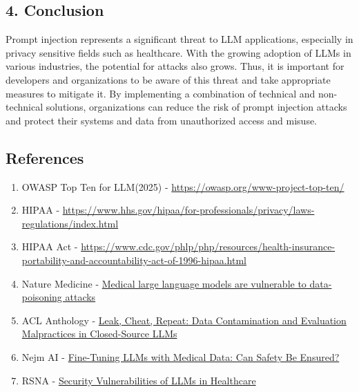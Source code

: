 \documentclass{article}
\theoremstyle{mytheoremstyle}
\theoremstyle{mytheoremstyle}
\theoremstyle{myproblemstyle}
\begin{document}
\subsection*{4. Conclusion}

Prompt injection represents a significant threat to LLM applications, especially in privacy sensitive fields such as healthcare. With the growing adoption of LLMs in various industries, the potential for attacks also grows. Thus, it is important for developers and organizations to be aware of this threat and take appropriate measures to mitigate it. By implementing a combination of technical and non-technical solutions, organizations can reduce the risk of prompt injection attacks and protect their systems and data from unauthorized access and misuse.

\subsection*{References}

\begin{enumerate}
    \item OWASP Top Ten for LLM(2025) - \url{https://owasp.org/www-project-top-ten/}
    \item HIPAA - \url{https://www.hhs.gov/hipaa/for-professionals/privacy/laws-regulations/index.html}
    \item HIPAA Act - \url{https://www.cdc.gov/phlp/php/resources/health-insurance-portability-and-accountability-act-of-1996-hipaa.html}
    \item Nature Medicine - \href{https://www.nature.com/articles/s41591-024-03445-1}{Medical large language models are vulnerable to data-poisoning attacks}
    \item ACL Anthology - \href{https://aclanthology.org/2024.eacl-long.5/}{Leak, Cheat, Repeat: Data Contamination and Evaluation Malpractices in Closed-Source LLMs}
    \item Nejm AI - \href{https://ai.nejm.org/doi/full/10.1056/AIcs2400390}{Fine-Tuning LLMs with Medical Data: Can Safety Be Ensured?}
    \item RSNA - \href{https://pubs.rsna.org/page/ai/blog/2024/7/ryai_editorsblog073124}{Security Vulnerabilities of LLMs in Healthcare
    }
\end{enumerate}
\end{document}

